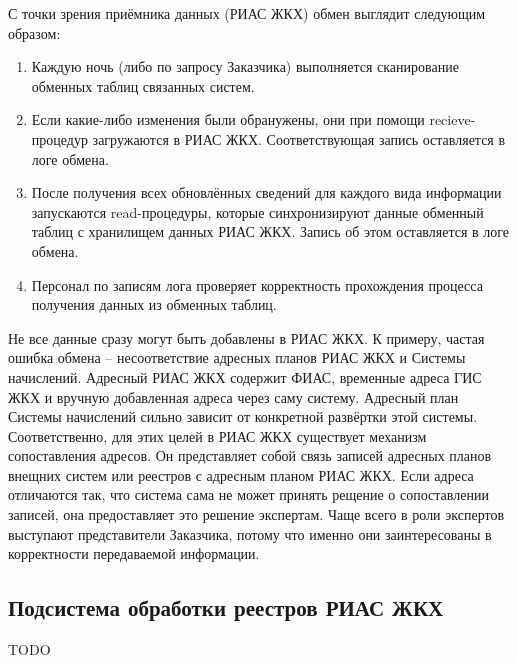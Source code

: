С точки зрения приёмника данных (РИАС ЖКХ) обмен выглядит следующим образом:
\begin{enumerate}
	\item Каждую ночь (либо по запросу Заказчика) выполняется сканирование обменных таблиц связанных систем.
	\item Если какие-либо изменения были обранужены, они при помощи recieve-процедур загружаются в РИАС ЖКХ. Соответствующая запись оставляется в логе обмена.
	\item После получения всех обновлённых сведений для каждого вида информации запускаются read-процедуры, которые синхронизируют данные обменный таблиц с хранилищем данных РИАС ЖКХ. Запись об этом оставляется в логе обмена.
	\item Персонал по записям лога проверяет корректность прохождения процесса получения данных из обменных таблиц.
\end{enumerate}

Не все данные сразу могут быть добавлены в РИАС ЖКХ.
К примеру, частая ошибка обмена -- несоответствие адресных планов РИАС ЖКХ и Системы начислений.
Адресный РИАС ЖКХ содержит ФИАС, временные адреса ГИС ЖКХ и вручную добавленная адреса через саму систему.
Адресный план Системы начислений сильно зависит от конкретной развёртки этой системы.
Соответственно, для этих целей в РИАС ЖКХ существует механизм сопоставления адресов.
Он представляет собой связь записей адресных планов внещних систем или реестров с адресным планом РИАС ЖКХ.
Если адреса отличаются так, что система сама не может принять рещение о сопоставлении записей, она предоставляет это решение экспертам.
Чаще всего в роли экспертов выступают представители Заказчика, потому что именно они заинтересованы в корректности передаваемой информации.

\subsection{Подсистема обработки реестров РИАС ЖКХ}

TODO

\clearpage
\newpage
